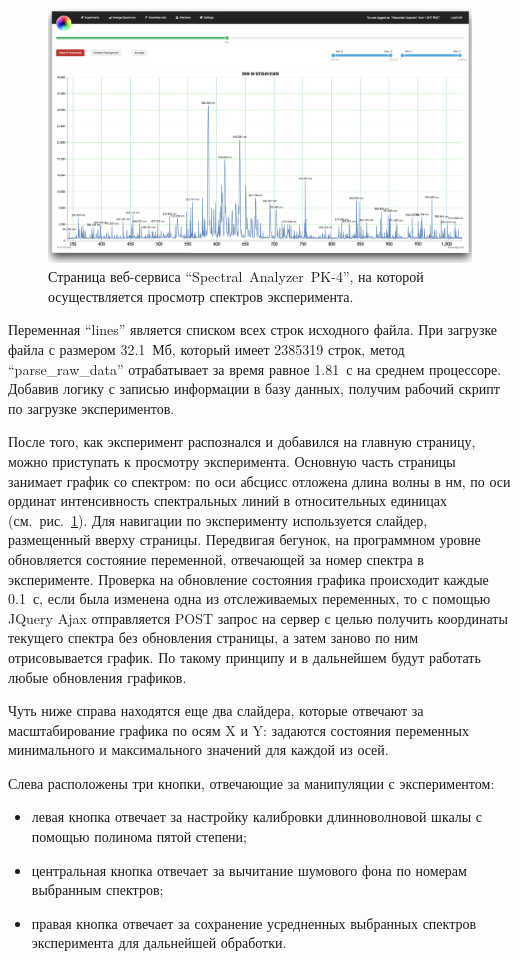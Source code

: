 \begin{figure}[t]
  \centering
  \includegraphics[width=16cm]{figures/experiment}
  \caption{Страница веб-сервиса “Spectral~Analyzer~PK-4”, на которой осуществляется просмотр спектров эксперимента.}
  \label{fig:experiment}
\end{figure}
Переменная “lines” является списком всех строк исходного файла. При загрузке файла с размером 32.1~Мб, который имеет
2385319 строк, метод “parse\_raw\_data” отрабатывает за время равное 1.81~с на среднем процессоре. Добавив логику с записью
информации в базу данных, получим рабочий скрипт по загрузке экспериментов.

После того, как эксперимент распознался и добавился на главную страницу, можно приступать к просмотру эксперимента.
Основную часть страницы занимает график со спектром: по оси абсцисс отложена длина волны в нм, по оси ординат интенсивность
спектральных линий в относительных единицах (см.~рис.~\ref{fig:experiment}). Для навигации по эксперименту используется слайдер,
размещенный вверху страницы. Передвигая бегунок, на программном уровне обновляется состояние переменной, отвечающей за номер спектра в эксперименте.
Проверка на обновление состояния графика происходит каждые 0.1~с, если была изменена одна из отслеживаемых переменных, то
с помощью JQuery Ajax отправляется POST запрос на сервер с целью получить координаты текущего спектра без обновления
страницы, а затем заново по ним отрисовывается график. По такому принципу и в дальнейшем будут работать любые обновления
графиков.

Чуть ниже справа находятся еще два слайдера, которые отвечают за масштабирование графика по осям X и Y: задаются
состояния переменных минимального и максимального значений для каждой из осей.

Слева расположены три кнопки, отвечающие за манипуляции с экспериментом:
\begin{itemize}
\item левая кнопка отвечает за настройку калибровки длинноволновой шкалы с помощью полинома пятой степени;
\item центральная кнопка отвечает за вычитание шумового фона по номерам выбранным спектров;
\item правая кнопка отвечает за сохранение усредненных выбранных спектров эксперимента для дальнейшей обработки.
\end{itemize}

